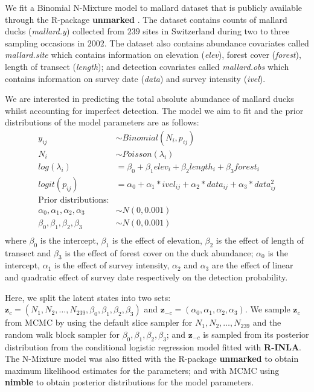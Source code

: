 \documentclass[
]{article}
\begin{document}
We fit a Binomial N-Mixture model to mallard dataset that is publicly
available through the R-package \textbf{unmarked} \citep{unmarked}. The
dataset contains counts of mallard ducks (\textit{mallard.y}) collected
from \(239\) sites in Switzerland during two to three sampling occasions
in \(2002\). The dataset also contains abundance covariates called
\textit{mallard.site} which contains information on elevation
(\textit{elev}), forest cover (\textit{forest}), length of transect
(\textit{length}); and detection covariates called \textit{mallard.obs}
which contains information on survey date (\textit{data}) and survey
intensity (\textit{ivel}).

We are interested in predicting the total absolute abundance of mallard
ducks whilst accounting for imperfect detection. The model we aim to fit
and the prior distributions of the model parameters are as follows:
\begin{equation}
\begin{split}
y_{ij} &\sim Binomial(N_i, {p_{ij}}) \\
N_i & \sim Poisson(\lambda_i) \\
log(\lambda_i) &= \beta_0 + \beta_1 elev_i + \beta_2 length_i + \beta_3 forest_i \\
logit(p_{ij}) &= \alpha_{0} + \alpha_1 * ivel_{ij} + \alpha_2*data_{ij} +  \alpha_3*data_{ij}^{2} \\
\text{Prior distributions:}\\
\alpha_0, \alpha_1, \alpha_2, \alpha_3 &\sim N(0, 0.001) \\
\beta_0, \beta_1, \beta_2, \beta_3 &\sim N(0, 0.001)\\
\end{split}
\end{equation} where \(\beta_0\) is the intercept, \(\beta_1\) is the
effect of elevation, \(\beta_2\) is the effect of length of transect and
\(\beta_3\) is the effect of forest cover on the duck abundance;
\(\alpha_0\) is the intercept, \(\alpha_1\) is the effect of survey
intensity, \(\alpha_2\) and \(\alpha_3\) are the effect of linear and
quadratic effect of survey date respectively on the detection
probability.

Here, we split the latent states into two sets:
\(\mathbf{z}_{c} = (N_1, N_2, \ldots, N_{239}, \beta_0, \beta_1, \beta_2, \beta_3)\)
and \(\mathbf{z}_{-c} = (\alpha_0, \alpha_1, \alpha_2, \alpha_3)\). We
sample \(\mathbf{z}_{c}\) from MCMC by using the default slice sampler
for \(N_1, N_2, \ldots, N_{239}\) and the random walk block sampler for
\(\beta_0, \beta_1, \beta_2, \beta_3\); and \(\mathbf{z}_{-c}\) is
sampled from its posterior distribution from the conditional logistic
regression model fitted with \textbf{R-INLA}. The N-Mixture model was
also fitted with the R-package \textbf{unmarked} to obtain maximum
likelihood estimates for the parameters; and with MCMC using
\textbf{nimble} to obtain posterior distributions for the model
parameters.
\end{document}
